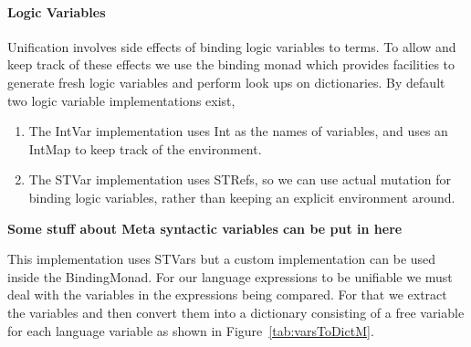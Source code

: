 \documentclass[thesis-solanki.tex]{subfiles}
\begin{document}
\paragraph{Logic Variables}
Unification involves side effects of binding logic variables to terms. To allow and keep track of these effects we use the binding monad
which provides facilities to generate fresh logic variables and perform look ups on dictionaries. By default two logic variable
implementations exist,

\begin{enumerate}
\item The IntVar implementation uses Int as the names of variables, and uses an
IntMap to keep track of the environment.

\item The STVar implementation uses STRefs, so we can use actual mutation for binding logic variables,
rather than keeping an explicit environment around.

\end{enumerate}

\textbf{Some stuff about Meta syntactic variables can be put in here}

This implementation uses STVars but a custom implementation can be used inside the BindingMonad.
For our language expressions to be unifiable we must deal with the variables in the expressions being compared. For that we extract the
variables and then convert them into a dictionary consisting of a free
variable for each language variable as shown in Figure~\ref{tab:varsToDictM}.
\end{document}
